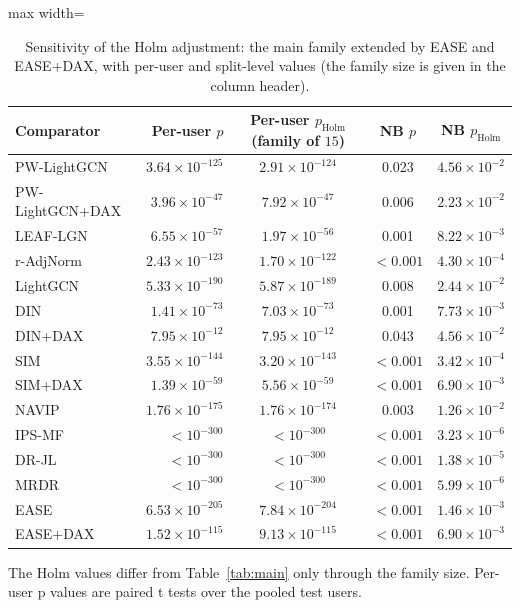 \begin{table}[tbp]
\centering
\footnotesize
\caption{Sensitivity of the Holm adjustment: the main family extended by EASE and EASE+DAX, with per-user and split-level values (the family size is given in the column header).}
\label{tab:sens}
\begin{adjustbox}{max width=\linewidth}
\begin{tabular}{lrccc}
\toprule
Comparator & Per-user $p$ & Per-user $p_{\mathrm{Holm}}$ (family of $15$) & NB $p$ & NB $p_{\mathrm{Holm}}$ \\
\midrule
PW-LightGCN & $3.64\times10^{-125}$ & $2.91\times10^{-124}$ & 0.023 & $4.56\times10^{-2}$ \\
PW-LightGCN+DAX & $3.96\times10^{-47}$ & $7.92\times10^{-47}$ & 0.006 & $2.23\times10^{-2}$ \\
LEAF-LGN & $6.55\times10^{-57}$ & $1.97\times10^{-56}$ & 0.001 & $8.22\times10^{-3}$ \\
r-AdjNorm & $2.43\times10^{-123}$ & $1.70\times10^{-122}$ & $<0.001$ & $4.30\times10^{-4}$ \\
LightGCN & $5.33\times10^{-190}$ & $5.87\times10^{-189}$ & 0.008 & $2.44\times10^{-2}$ \\
DIN & $1.41\times10^{-73}$ & $7.03\times10^{-73}$ & 0.001 & $7.73\times10^{-3}$ \\
DIN+DAX & $7.95\times10^{-12}$ & $7.95\times10^{-12}$ & 0.043 & $4.56\times10^{-2}$ \\
SIM & $3.55\times10^{-144}$ & $3.20\times10^{-143}$ & $<0.001$ & $3.42\times10^{-4}$ \\
SIM+DAX & $1.39\times10^{-59}$ & $5.56\times10^{-59}$ & $<0.001$ & $6.90\times10^{-3}$ \\
NAVIP & $1.76\times10^{-175}$ & $1.76\times10^{-174}$ & 0.003 & $1.26\times10^{-2}$ \\
IPS-MF & $<10^{-300}$ & $<10^{-300}$ & $<0.001$ & $3.23\times10^{-6}$ \\
DR-JL & $<10^{-300}$ & $<10^{-300}$ & $<0.001$ & $1.38\times10^{-5}$ \\
MRDR & $<10^{-300}$ & $<10^{-300}$ & $<0.001$ & $5.99\times10^{-6}$ \\
EASE & $6.53\times10^{-205}$ & $7.84\times10^{-204}$ & $<0.001$ & $1.46\times10^{-3}$ \\
EASE+DAX & $1.52\times10^{-115}$ & $9.13\times10^{-115}$ & $<0.001$ & $6.90\times10^{-3}$ \\
\bottomrule
\end{tabular}
\end{adjustbox}
\par\smallskip
\begin{minipage}{\linewidth}\raggedright\footnotesize The Holm values differ from Table~\ref{tab:main} only through the family size. Per-user p values are paired t tests over the pooled test users.\end{minipage}
\end{table}
